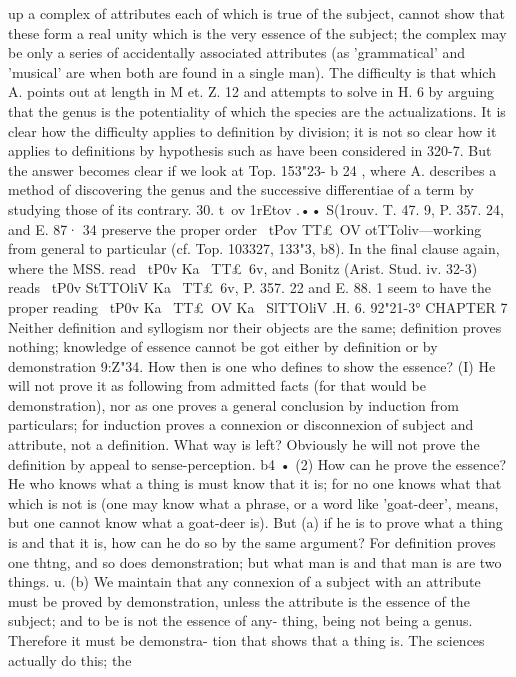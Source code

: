 {{{{{{{{{{{{{{{{{{{up a complex of attributes each of which is true of the subject,
cannot show that these form a real unity which is the very
essence of the subject; the complex may be only a series of
accidentally associated attributes (as 'grammatical' and 'musical'
are when both are found in a single man). The difficulty is that
which A. points out at length in M et. Z. 12 and attempts to solve
in H. 6 by arguing that the genus is the potentiality of which the
species are the actualizations. It is clear how the difficulty
applies to definition by division; it is not so clear how it applies
to definitions by hypothesis such as have been considered in
320-7. But the answer becomes clear if we look at Top. 153"23-
b 24 , where A. describes a method of discovering the genus and the
successive differentiae of a term by studying those of its contrary.
30. t~ov 1rEtov .•• S(1rouv. T. 47. 9, P. 357. 24, and E. 87· 34
preserve the proper order ~tPov TT£~OV otTToliv---working from
general to particular (cf. Top. 103327, 133"3, b8). In the final
clause again, where the MSS. read ~tP0v Ka~ TT£~6v, and Bonitz
(Arist. Stud. iv. 32-3) reads ~tP0v StTTOliV Ka~ TT£~6v, P. 357. 22 and
E. 88. 1 seem to have the proper reading ~tP0v Ka~ TT£~OV Ka~
SlTTOliV .H. 6. 92"21-3°
CHAPTER 7
Neither definition and syllogism nor their objects are the same;
definition proves nothing; knowledge of essence cannot be got either
by definition or by demonstration
9:Z"34. How then is one who defines to show the essence? (I)
He will not prove it as following from admitted facts (for that
would be demonstration), nor as one proves a general conclusion
by induction from particulars; for induction proves a connexion
or disconnexion of subject and attribute, not a definition. What
way is left? Obviously he will not prove the definition by appeal
to sense-perception.
b4 • (2) How can he prove the essence? He who knows what
a thing is must know that it is; for no one knows what that which
is not is (one may know what a phrase, or a word like 'goat-deer',
means, but one cannot know what a goat-deer is). But (a) if he
is to prove what a thing is and that it is, how can he do so by
the same argument? For definition proves one thtng, and so does
demonstration; but what man is and that man is are two things.
u. (b) We maintain that any connexion of a subject with an
attribute must be proved by demonstration, unless the attribute
is the essence of the subject; and to be is not the essence of any-
thing, being not being a genus. Therefore it must be demonstra-
tion that shows that a thing is. The sciences actually do this; the
}}}}}}}}}}}}}}}}}}}
